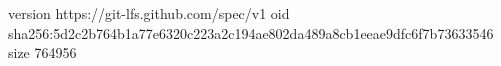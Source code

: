 version https://git-lfs.github.com/spec/v1
oid sha256:5d2c2b764b1a77e6320c223a2c194ae802da489a8cb1eeae9dfc6f7b73633546
size 764956
